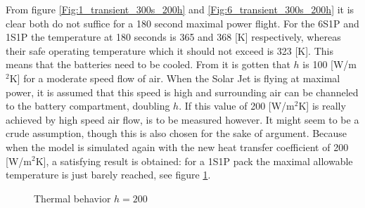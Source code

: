 From figure \ref{Fig:1_transient_300s_200h} and \ref{Fig:6_transient_300s_200h} it is clear both do not suffice for a 180 second maximal power flight. For the 6S1P and 1S1P the temperature at 180 seconds is 365 and 368 [K] respectively, whereas their safe operating temperature which it should not exceed is 323 [K]. This means that the batteries need to be cooled. From \cite{heat_transfer_coefficient} it is gotten that $h$ is 100 [W/m$^2$K] for a moderate speed flow of air. When the Solar Jet is flying at maximal power, it is assumed that this speed is high and surrounding air can be channeled to the battery compartment, doubling $h$. If this value of 200 [W/m$^2$K] is really achieved by high speed air flow, is to be measured however. It might seem to be a crude assumption, though this is also chosen for the sake of argument. Because when the model is simulated again with the new heat transfer coefficient of 200 [W/m$^2$K], a satisfying result is obtained: for a 1S1P pack the maximal allowable temperature is just barely reached, see figure \ref{Fig:thermal_behavior_200h}. 

\begin{figure}[H]
  \centering
  \hfill
  \caption{Thermal behavior $h = 200$ }
  \label{Fig:thermal_behavior_200h}
\end{figure}

